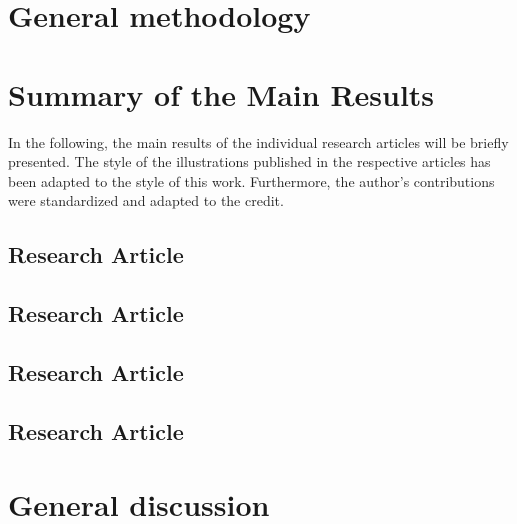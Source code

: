 \documentclass{book}
\newcommand{\uproman}[1]{\uppercase\expandafter{\romannumeral#1}}
\begin{document}
\chapter{General methodology}
\label{chap:methods}


\chapter{Summary of the Main Results}
In the following, the main results of the individual research articles will be briefly presented. The style of the illustrations published in the respective articles has been adapted to the style of this work. Furthermore, the author's contributions were standardized and adapted to the \gls{credit}. 
\label{chap:results}
    \section{Research Article \uproman{1}}
    \label{results:paperI}
    
    
    \section{Research Article \uproman{2}}
    \label{results:paperII}
    

    \section{Research Article \uproman{3}}
    \label{results:paperIII}
    
    
    \section{Research Article \uproman{4}}
    \label{results:paperIV}
    
    
\chapter{General discussion}
\label{chap:discussion}

\printbibliography[heading=bibintoc,title={References}]

\chapter*{\vspace*{\fill}\vspace*{\fill}}
\label{pub:papers}
    \newpage
\end{document}
